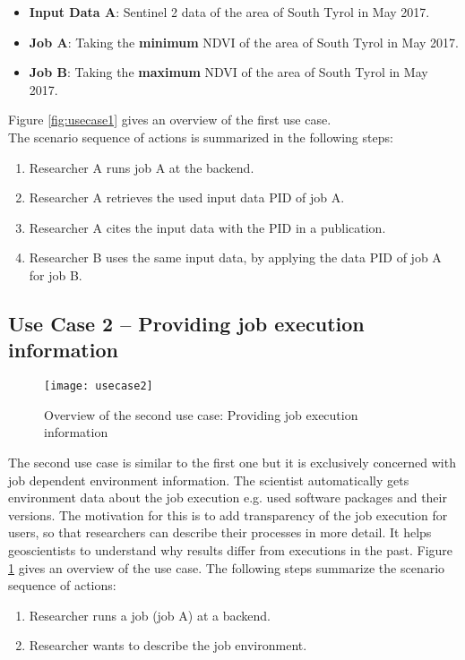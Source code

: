\documentclass[draft,final]{vutinfth} %
\begin{document}
\begin{itemize}
	\item \textbf{Input Data A}: Sentinel 2 data of the area of South Tyrol in May 2017. 
	\item \textbf{Job A}: Taking the \textbf{minimum} NDVI of the area of South Tyrol in May 2017. 
	\item \textbf{Job B}: Taking the \textbf{maximum} NDVI of the area of South Tyrol in May 2017.
\end{itemize}

Figure \ref{fig:usecase1} gives an overview of the first use case. \\

The scenario sequence of actions is summarized in the following steps: \\

\begin{enumerate}
	\item Researcher A runs job A at the backend.
	\item Researcher A retrieves the used input data PID of job A.
	\item Researcher A cites the input data with the PID in a publication.
	\item Researcher B uses the same input data, by applying the data PID of job A for job B.  
\end{enumerate}

\subsection{Use Case 2 – Providing job execution information}\label{UseCase2}
\begin{figure}[h]
	\centering
	\texttt{[image: usecase2]}
	\caption{Overview of the second use case: Providing job execution information}
	\label{fig:usecase2} %
\end{figure}

The second use case is similar to the first one but it is exclusively concerned with job dependent environment information. The scientist automatically gets environment data about the job execution e.g. used software packages and their versions. The motivation for this is to add transparency of the job execution for users, so that researchers can describe their processes in more detail. It helps geoscientists to understand why results differ from executions in the past. Figure \ref{fig:usecase2} gives an overview of the use case. 
The following steps summarize the scenario sequence of actions: \\
\begin{enumerate}
	\item Researcher runs a job (job A) at a backend.
	\item Researcher wants to describe the job environment.
\end{enumerate}
\end{document}
